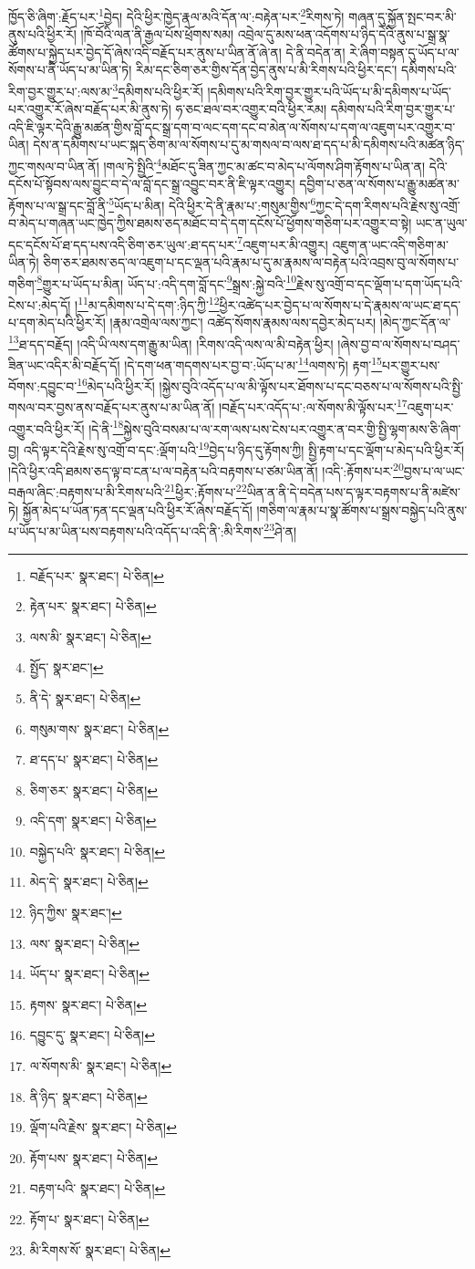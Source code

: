 ཁྱོད་ཅི་ཞིག་:རྗོད་པར་\footnote{བརྗོད་པར་  སྣར་ཐང་།  པེ་ཅིན། }བྱེད། དེའི་ཕྱིར་ཁྱེད་རྣལ་མའི་དོན་ལ་:བརྟེན་པར་\footnote{རྟེན་པར་  སྣར་ཐང་།  པེ་ཅིན། }རིགས་ཏེ། གཞན་དུ་སྐྱོན་སྤང་བར་མི་ནུས་པའི་ཕྱིར་རོ། །ཁོ་བོའི་ལན་ནི་རྒྱལ་པོས་ཕྲོགས་སམ། འབྲེལ་དུ་མས་ཕན་འདོགས་པ་ཉིད་དེའི་ནུས་པ་སྒྲ་སྣ་ཚོགས་པ་སྐྱེད་པར་བྱེད་དོ་ཞེས་འདི་བརྗོད་པར་ནུས་པ་ཡིན་ནོ་ཞེ་ན། དེ་ནི་བདེན་ན། རེ་ཞིག་བསྟན་དུ་ཡོད་པ་ལ་སོགས་པ་ནི་ཡོད་པ་མ་ཡིན་ཏེ། རིམ་དང་ཅིག་ཅར་གྱིས་དོན་བྱེད་ནུས་པ་མི་རིགས་པའི་ཕྱིར་དང་། དམིགས་པའི་རིག་བྱར་གྱུར་པ་:ལས་མ་\footnote{ལས་མི་  སྣར་ཐང་།  པེ་ཅིན། }དམིགས་པའི་ཕྱིར་རོ། །དམིགས་པའི་རིག་བྱར་གྱུར་པའི་ཡོད་པ་མི་དམིགས་པ་ཡོད་པར་འགྱུར་རོ་ཞེས་བརྗོད་པར་མི་ནུས་ཏེ། ཧ་ཅང་ཐལ་བར་འགྱུར་བའི་ཕྱིར་རམ། དམིགས་པའི་རིག་བྱར་གྱུར་པ་འདི་ཇི་ལྟར་དེའི་རྒྱུ་མཚན་གྱིས་བློ་དང་སྒྲ་དག་བ་ལང་དག་དང་བ་མེན་ལ་སོགས་པ་དག་ལ་འཇུག་པར་འགྱུར་བ་ཡིན། དེས་ན་དམིགས་པ་ཡང་སྐད་ཅིག་མ་ལ་སོགས་པ་དུ་མ་གསལ་བ་ལས་ཐ་དད་པ་མི་དམིགས་པའི་མཚན་ཉིད་ཀྱང་གསལ་བ་ཡིན་ནོ། །གལ་ཏེ་སྤྱིའི་\footnote{སྤྱོད་  སྣར་ཐང་། }མཐོང་དུ་ཟིན་ཀྱང་མ་ཚང་བ་མེད་པ་ལོགས་ཤིག་རྟོགས་པ་ཡིན་ན། དེའི་དངོས་པོ་སྟོབས་ལས་བྱུང་བ་དེ་ལ་བློ་དང་སྒྲ་འབྱུང་བར་ནི་ཇི་ལྟར་འགྱུར། དབྱིག་པ་ཅན་ལ་སོགས་པ་རྒྱུ་མཚན་མ་རྟོགས་པ་ལ་སྒྲ་དང་བློ་ནི་\footnote{ནི་དེ་  སྣར་ཐང་།  པེ་ཅིན། }ཡོད་པ་མིན། དེའི་ཕྱིར་དེ་ནི་རྣམ་པ་:གསུམ་གྱིས་\footnote{གསུམ་གས་  སྣར་ཐང་།  པེ་ཅིན། }ཀྱང་དེ་དག་རིགས་པའི་རྗེས་སུ་འགྲོ་བ་མེད་པ་གཞན་ཡང་ཁྱེད་ཀྱིས་ཐམས་ཅད་མཐོང་བ་དེ་དག་དངོས་པོ་ཕྱོགས་གཅིག་པར་འགྱུར་བ་སྟེ། ཡང་ན་ཡུལ་དང་དངོས་པོ་ཐ་དད་པས་འདི་ཅིག་ཅར་ཡུལ་:ཐ་དད་པར་\footnote{ཐ་དད་པ་  སྣར་ཐང་།  པེ་ཅིན། }འཇུག་པར་མི་འགྱུར། འཇུག་ན་ཡང་འདི་གཅིག་མ་ཡིན་ཏེ། ཅིག་ཅར་ཐམས་ཅད་ལ་འཇུག་པ་དང་ལྡན་པའི་རྣམ་པ་དུ་མ་རྣམས་ལ་བརྟེན་པའི་འབྲས་བུ་ལ་སོགས་པ་གཅིག་\footnote{ཅིག་ཅར་  སྣར་ཐང་།  པེ་ཅིན། }གྱུར་པ་ཡོད་པ་མིན། ཡོད་པ་:འདི་དག་བློ་དང་\footnote{འདི་དག་  སྣར་ཐང་།  པེ་ཅིན། }སྒྲས་:སྐྱེ་བའི་\footnote{བསྐྱེད་པའི་  སྣར་ཐང་།  པེ་ཅིན། }རྗེས་སུ་འགྲོ་བ་དང་ལྡོག་པ་དག་ཡོད་པའི་ངེས་པ་:མེད་དོ། །\footnote{མེད་དེ་  སྣར་ཐང་།  པེ་ཅིན། }མ་དམིགས་པ་དེ་དག་:ཉིད་ཀྱི་\footnote{ཉིད་ཀྱིས་  སྣར་ཐང་། }ཕྱིར་འཚེད་པར་བྱེད་པ་ལ་སོགས་པ་དེ་རྣམས་ལ་ཡང་ཐ་དད་པ་དག་མེད་པའི་ཕྱིར་རོ། །རྣམ་འགྲེལ་ལས་ཀྱང་། འཚེད་སོགས་རྣམས་ལས་དབྱེར་མེད་པར། །མེད་ཀྱང་དོན་ལ་\footnote{ལས་  སྣར་ཐང་།  པེ་ཅིན། }ཐ་དད་བརྗོད། །འདི་ཡི་ལས་དག་རྒྱུ་མ་ཡིན། །རིགས་འདི་ལས་ལ་མི་བརྟེན་ཕྱིར། །ཞེས་བྱ་བ་ལ་སོགས་པ་བཤད་ཟིན་ཡང་འདིར་མི་བརྗོད་དོ། །དེ་དག་ཕན་གདགས་པར་བྱ་བ་:ཡོད་པ་མ་\footnote{ཡོད་པ་  སྣར་ཐང་།  པེ་ཅིན། }ལགས་ཏེ། རྟག་\footnote{རྟགས་  སྣར་ཐང་།  པེ་ཅིན། }པར་གྱུར་པས་བོགས་:དབྱུང་བ་\footnote{དབྱུང་དུ་  སྣར་ཐང་།  པེ་ཅིན། }མེད་པའི་ཕྱིར་རོ། །སྐྱེས་བུའི་འདོད་པ་ལ་མི་ལྟོས་པར་ཐོགས་པ་དང་བཅས་པ་ལ་སོགས་པའི་སྤྱི་གསལ་བར་བྱས་ནས་བརྗོད་པར་ནུས་པ་མ་ཡིན་ནོ། །བརྗོད་པར་འདོད་པ་:ལ་སོགས་མི་ལྟོས་པར་\footnote{ལ་སོགས་མི་  སྣར་ཐང་།  པེ་ཅིན། }འཇུག་པར་འགྱུར་བའི་ཕྱིར་རོ། །དེ་ནི་\footnote{ནི་ཉིད་  སྣར་ཐང་།  པེ་ཅིན། }སྐྱེས་བུའི་བསམ་པ་ལ་རག་ལས་པས་ངེས་པར་འགྱུར་ན་བར་གྱི་སྤྱི་ལྷག་མས་ཅི་ཞིག་བྱ། འདི་ལྟར་དེའི་རྗེས་སུ་འགྲོ་བ་དང་:ལྡོག་པའི་\footnote{ལྡོག་པའི་རྗེས་  སྣར་ཐང་།  པེ་ཅིན། }བྱེད་པ་ཉིད་དུ་རྟོགས་ཀྱི། སྤྱི་རྟག་པ་དང་ལྡོག་པ་མེད་པའི་ཕྱིར་རོ། །དེའི་ཕྱིར་འདི་ཐམས་ཅད་ལྟ་བ་ངན་པ་ལ་བརྟེན་པའི་བརྟགས་པ་ཙམ་ཡིན་ནོ། །འདི་:རྟོགས་པར་\footnote{རྟོག་པས་  སྣར་ཐང་།  པེ་ཅིན། }བྱས་པ་ལ་ཡང་བརྒལ་ཞིང་:བརྟགས་པ་མི་རིགས་པའི་\footnote{བརྟག་པའི་  སྣར་ཐང་།  པེ་ཅིན། }ཕྱིར་:རྟོགས་པ་\footnote{རྟོག་པ་  སྣར་ཐང་།  པེ་ཅིན། }ཡིན་ན་ནི་དེ་བདེན་པས་ད་ལྟར་བརྟགས་པ་ནི་མཛེས་ཏེ། སྐྱོན་མེད་པ་ཡོན་ཏན་དང་ལྡན་པའི་ཕྱིར་རོ་ཞེས་བརྗོད་དོ། །གཅིག་ལ་རྣམ་པ་སྣ་ཚོགས་པ་སྒྲས་བསྐྱེད་པའི་ནུས་པ་ཡོད་པ་མ་ཡིན་པས་བརྟགས་པའི་འདོད་པ་འདི་ནི་:མི་རིགས་\footnote{མི་རིགས་སོ་  སྣར་ཐང་།  པེ་ཅིན། }ཤེ་ན། 